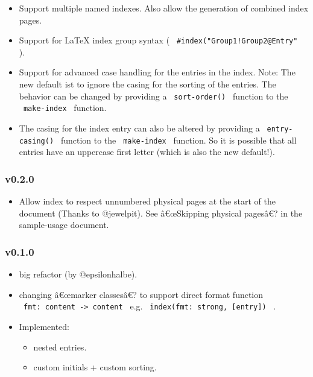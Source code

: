 \begin{itemize}
\tightlist
\item
  Support multiple named indexes. Also allow the generation of combined
  index pages.
\item
  Support for LaTeX index group syntax (
  \texttt{\ \#index("Group1!Group2@Entry"\ } ).
\item
  Support for advanced case handling for the entries in the index. Note:
  The new default ist to ignore the casing for the sorting of the
  entries. The behavior can be changed by providing a
  \texttt{\ sort-order()\ } function to the \texttt{\ make-index\ }
  function.
\item
  The casing for the index entry can also be altered by providing a
  \texttt{\ entry-casing()\ } function to the \texttt{\ make-index\ }
  function. So it is possible that all entries have an uppercase first
  letter (which is also the new default!).
\end{itemize}

\subsubsection{v0.2.0}\label{v0.2.0}

\begin{itemize}
\tightlist
\item
  Allow index to respect unnumbered physical pages at the start of the
  document (Thanks to @jewelpit). See â€œSkipping physical pagesâ€? in
  the sample-usage document.
\end{itemize}

\subsubsection{v0.1.0}\label{v0.1.0}

\begin{itemize}
\tightlist
\item
  big refactor (by @epsilonhalbe).
\item
  changing â€œmarker classesâ€? to support direct format function
  \texttt{\ fmt:\ content\ -\textgreater{}\ content\ } e.g.
  \texttt{\ index(fmt:\ strong,\ {[}entry{]})\ } .
\item
  Implemented:

  \begin{itemize}
  \tightlist
  \item
    nested entries.
  \item
    custom initials + custom sorting.
  \end{itemize}
\end{itemize}


